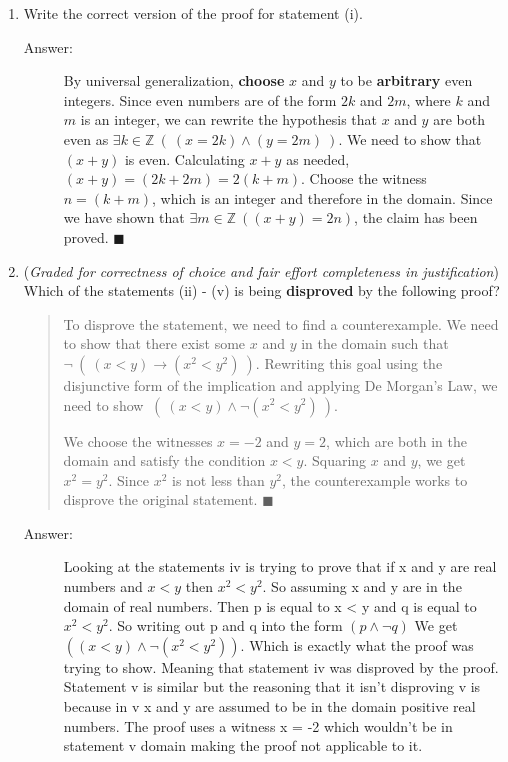 \documentclass[12pt, oneside]{article}
\begin{document}
\begin{enumerate}
\begin{enumerate}
\item Write the correct version of the proof for statement (i).

\begin{description}
    \item[Answer:] By universal generalization, {\bf choose} $x$ and $y$ to be {\bf arbitrary} even integers. 
  Since even numbers are of the form $2k$ and $2m$, where $k$ and $m$ is an integer, we can rewrite the hypothesis that $x$ and $y$ are both even as $\exists k \in \mathbb{Z}~(~(x = 2k) \land (y= 2m)~)$. We need to show that $(x + y)$ is even. 
  Calculating $x+y$ as needed, 
  $(x+y) = (2k + 2m) = 2(k + m)$. Choose the witness $n = (k + m) $, which is an integer and therefore in the domain. Since we have shown that $\exists m \in \mathbb{Z}~( (x+y) = 2n)$, the claim has been proved. \hfill{$\blacksquare$}
\end{description}

\item ({\it Graded for correctness of choice and fair effort completeness in justification}) 
Which of the statements (ii) - (v) is being {\bf disproved} by the following proof?

\begin{quote}
  To disprove the statement, we need to find a counterexample. We need to show that there exist some $x$ and $y$ in the domain such that
  $\neg ~(~(x<y) \to (x^2 < y^2)~)$. Rewriting this goal using the disjunctive form of the implication and applying De Morgan's Law, we need to show  $~(~(x<y) \land \neg(x^2 < y^2)~)$.
  
  We choose the witnesses $x = -2$ and $y=2$, which are both in the domain and satisfy the condition $x < y$. Squaring $x$ and $y$, we get $x^2 = y^2$. Since $x^2$ is not less than $y^2$, the counterexample works to 
  disprove the original statement.
  \hfill{$\blacksquare$}
\end{quote}

\begin{description}
    \item[Answer:] Looking at the statements iv is trying to prove that if x and y are real numbers 
    and $x < y$ then $x^2 < y^2$. So assuming x and y are in the domain of real numbers. Then p is equal to x < y and q is equal to $x^2 < y^2$. So writing out p and q into the form $(p \land \lnot q)$
    We get $( (x < y) \land \lnot(x^2 < y^2 ))$. Which is exactly what the proof was trying to show. Meaning that statement iv was disproved by the proof. Statement v is similar but the reasoning that it isn’t disproving v is because in v x and y are assumed to be in the domain positive real numbers. The proof uses a witness x = -2 which wouldn’t be in statement v domain making the proof not applicable to it.    
\end{description}


\end{enumerate}
\end{enumerate}
\end{document}
